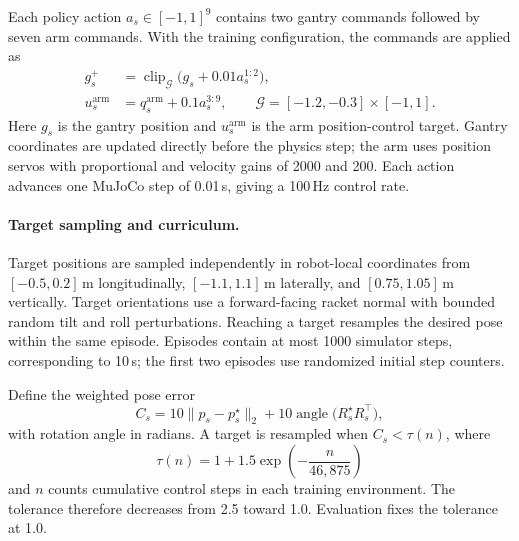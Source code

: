 \documentclass[pmlr]{jmlr}
\begin{document}
Each policy action $a_s\in[-1,1]^9$ contains two gantry commands followed by seven arm commands. With the training configuration, the commands are applied as
\begin{equation}
\begin{aligned}
 g_s^+&=\operatorname{clip}_{\mathcal G}\big(g_s+0.01a_s^{1:2}\big),\\
 u_s^{\mathrm{arm}}&=q_s^{\mathrm{arm}}+0.1a_s^{3:9},
 \qquad \mathcal G=[-1.2,-0.3]\times[-1,1].
\end{aligned}
 \label{eq:trackeraction}
\end{equation}
Here $g_s$ is the gantry position and $u_s^{\mathrm{arm}}$ is the arm position-control target. Gantry coordinates are updated directly before the physics step; the arm uses position servos with proportional and velocity gains of 2000 and 200. Each action advances one MuJoCo step of 0.01\,s, giving a 100\,Hz control rate.

\paragraph{Target sampling and curriculum.}
Target positions are sampled independently in robot-local coordinates from $[-0.5,0.2]$\,m longitudinally, $[-1.1,1.1]$\,m laterally, and $[0.75,1.05]$\,m vertically. Target orientations use a forward-facing racket normal with bounded random tilt and roll perturbations. Reaching a target resamples the desired pose within the same episode. Episodes contain at most 1000 simulator steps, corresponding to 10\,s; the first two episodes use randomized initial step counters.

Define the weighted pose error
\begin{equation}
 C_s=10\|p_s-p_s^\star\|_2
     +10\operatorname{angle}\big(R_s^\star R_s^\top\big),
 \label{eq:trackerposeerror}
\end{equation}
with rotation angle in radians. A target is resampled when $C_s<\tau(n)$, where
\begin{equation}
 \tau(n)=1+1.5\exp\!\left(-\frac{n}{46{,}875}\right)
 \label{eq:trackercurriculum}
\end{equation}
and $n$ counts cumulative control steps in each training environment. The tolerance therefore decreases from 2.5 toward 1.0. Evaluation fixes the tolerance at 1.0.
\end{document}
